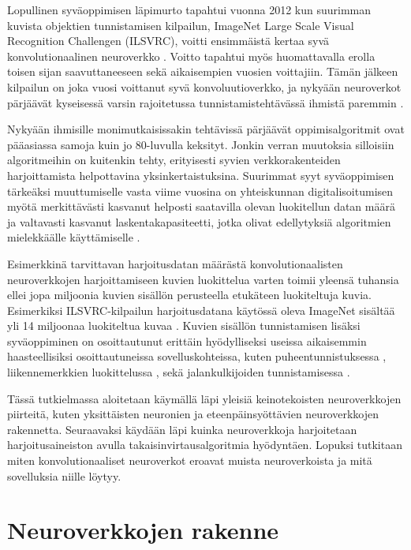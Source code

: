 \documentclass[finnish]{tktltiki2}
\theoremstyle{definition}
\theoremstyle{remark}
\begin{document}
  Lopullinen syväoppimisen läpimurto tapahtui vuonna 2012 kun suurimman kuvista objektien tunnistamisen kilpailun, ImageNet Large Scale Visual Recognition Challengen (ILSVRC), voitti ensimmäistä kertaa syvä konvolutionaalinen neuroverkko \cite{KSHimagenet2012}. Voitto tapahtui myös huomattavalla erolla toisen sijan saavuttaneeseen sekä aikaisempien vuosien voittajiin. Tämän jälkeen kilpailun on joka vuosi voittanut syvä konvoluutioverkko, ja nykyään neuroverkot pärjäävät kyseisessä varsin rajoitetussa tunnistamistehtävässä ihmistä paremmin \cite{Goodfellow-et-al-2016}.

  Nykyään ihmisille monimutkaisissakin tehtävissä pärjäävät oppimisalgoritmit ovat pääasiassa samoja kuin jo 80-luvulla keksityt. Jonkin verran muutoksia silloisiin algoritmeihin on kuitenkin tehty, erityisesti syvien verkkorakenteiden harjoittamista helpottavina yksinkertaistuksina. Suurimmat syyt syväoppimisen tärkeäksi muuttumiselle vasta viime vuosina on yhteiskunnan digitalisoitumisen myötä merkittävästi kasvanut helposti saatavilla olevan luokitellun datan määrä ja valtavasti kasvanut laskentakapasiteetti, jotka olivat edellytyksiä algoritmien mielekkäälle käyttämiselle \cite{Goodfellow-et-al-2016}.

  Esimerkkinä tarvittavan harjoitusdatan määrästä konvolutionaalisten neuroverkkojen harjoittamiseen kuvien luokittelua varten toimii yleensä tuhansia ellei jopa miljoonia kuvien sisällön perusteella etukäteen luokiteltuja kuvia. Esimerkiksi ILSVRC-kilpailun harjoitusdatana käytössä oleva ImageNet sisältää yli 14 miljoonaa luokiteltua kuvaa \cite{imagenet-website}. Kuvien sisällön tunnistamisen lisäksi syväoppiminen on osoittautunut erittäin hyödylliseksi useissa aikaisemmin haasteellisiksi osoittautuneissa sovelluskohteissa, kuten puheentunnistuksessa \cite{abdel2012applying}, liikennemerkkien luokittelussa \cite{sermanet2011traffic}, sekä jalankulkijoiden tunnistamisessa \cite{szarvas2005pedestrian}.

  Tässä tutkielmassa aloitetaan käymällä läpi yleisiä keinotekoisten neuroverkkojen piirteitä, kuten yksittäisten neuronien ja eteenpäinsyöttävien neuroverkkojen rakennetta. Seuraavaksi käydään läpi kuinka neuroverkkoja harjoitetaan harjoitusaineiston avulla takaisinvirtausalgoritmia hyödyntäen. Lopuksi tutkitaan miten konvolutionaaliset neuroverkot eroavat muista neuroverkoista ja mitä sovelluksia niille löytyy.

  \section{Neuroverkkojen rakenne}
\end{document}
